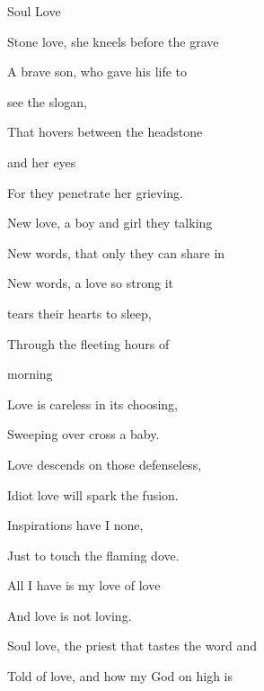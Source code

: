 \begin{song}{Soul Love}{
	
	\chordset[Verse]{ \GMaj \Em \CMaj \Bm \Am \DMaj }

	\chordset[Chorus]{ \FMaj \GSeven \Cm \GMajShE \DMajShA }
	
}

\begin{songverse}
Stone love, she kneels before the grave

A brave son, who gave his life to 

see the slogan,

That hovers between the headstone

and her eyes\quad{}

For they penetrate her grieving.

\end{songverse}
\begin{songverse}

New love, a boy and girl they talking

New words, that only they can share in

New words, a love so strong it

tears their hearts to sleep,

Through the fleeting hours of 

morning

\end{songverse}
\begin{songchorus}

Love is careless in its choosing,

Sweeping over cross a baby.

Love descends on those defenseless,

Idiot love will spark the fusion.


Inspirations have I none,

Just to touch the flaming dove.

All I have is my love of love

And love is not loving.

\end{songchorus}

\begin{songverse}


Soul love, the priest that tastes the word and

Told of love, and how my God on high is


\end{songverse}
\end{song}
